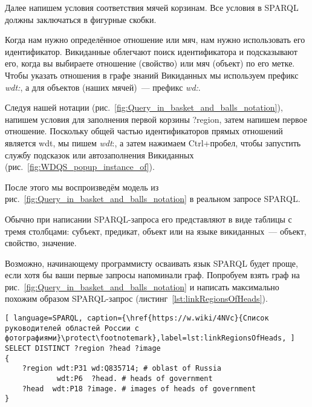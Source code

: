 Далее напишем условия соответствия мячей корзинам. Все условия в SPARQL должны заключаться в фигурные скобки.

Когда нам нужно определённое отношение или мяч, нам нужно использовать его идентификатор. Викиданные облегчают поиск идентификатора и подсказывают его, когда вы выбираете отношение (свойство) или мяч (объект) по его метке. Чтобы указать отношения в графе знаний Викиданных мы используем префикс \textit{wdt:}, а для объектов (наших мячей)~--- префикс \textit{wd:}.

Следуя нашей нотации (рис.~\ref{fig:Query_in_basket_and_balls_notation}), напишем условия для заполнения первой корзины ?region, затем напишем первое отношение. Поскольку общей частью идентификаторов прямых отношений является wdt, мы пишем \textit{wdt}:, а затем нажимаем Ctrl+пробел, чтобы запустить службу подсказок или  автозаполнения Викиданных (рис.~\ref{fig:WDQS_popup_instance_of}).

\begin{marginfigure}[-2.5cm]
	{
		\setlength{\fboxsep}{0pt}%
		\setlength{\fboxrule}{1pt}%
	}
    \caption{С помощью команды Ctrl+пробел открылось выпадающее контекстное меню автозаполнения свойства Викиданых.}
	\label{fig:WDQS_popup_instance_of}
\end{marginfigure}

После этого мы воспроизведём модель из рис.~\ref{fig:Query_in_basket_and_balls_notation} в реальном запросе SPARQL.

Обычно при написании SPARQL-запроса его представляют в виде таблицы с тремя столбцами: субъект, предикат, объект или на языке викиданных~--- объект, свойство, значение.

Возможно, начинающему программисту осваивать язык SPARQL будет проще, если хотя бы ваши первые запросы напоминали граф. Попробуем взять граф на рис.~\ref{fig:Query_in_basket_and_balls_notation} и написать максимально похожим образом SPARQL-запрос (листинг~\ref{lst:linkRegionsOfHeads}).

\begin{lstlisting}[ language=SPARQL, caption={\href{https://w.wiki/4NVc}{Список руководителей областей России с фотографиями}\protect\footnotemark},label=lst:linkRegionsOfHeads, ]
SELECT DISTINCT ?region ?head ?image
{
    ?region wdt:P31 wd:Q835714; # oblast of Russia
            wdt:P6  ?head. # heads of government
    ?head  wdt:P18 ?image. # images of heads of government
}
\end{lstlisting}


